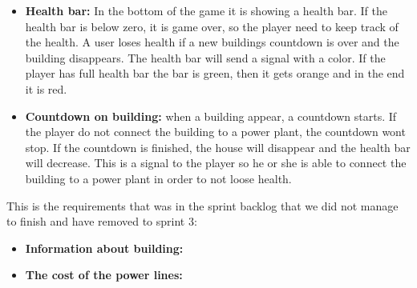 \begin{itemize}
		\item {\bf Health bar:} In the bottom of the game it is showing a health bar. If the 
		health bar is below zero, it is game over, so the player need to keep track of the health.
		A user loses health if a new buildings countdown is over and the building disappears.
		The health bar will send a signal with a color. If the player has full health bar the bar is
		green, then it gets orange and in the end it is red. 

		\item {\bf Countdown on building:} when a building appear, a countdown starts. If the player
		do not connect the building to a power plant, the countdown wont stop. If the countdown is
		finished, the house will disappear and the health bar will decrease. This is a signal to
		the player so he or she is able to connect the building to a power plant in order to not loose
		health. 

	\end{itemize}

	This is the requirements that was in the sprint backlog that we did not
	manage to finish and have removed to sprint 3:

	\begin{itemize}
		\item {\bf Information about building:}

		\item {\bf The cost of the power lines:}

	\end{itemize}

